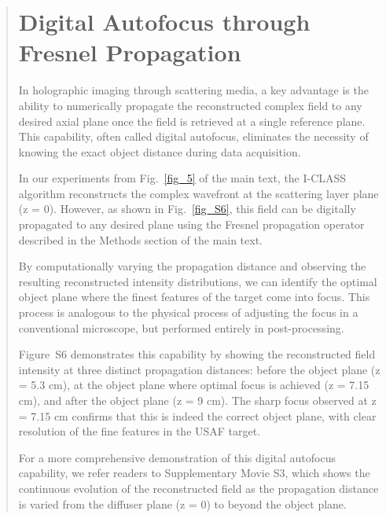 \documentclass[12pt]{article}
\newenvironment{ourresponse}
    {\begin{tcolorbox}[width=\linewidth,breakable,enhanced,colback=gray!5,colframe=responsecolor!50,title=Response,left=5pt,right=5pt]}
    {\end{tcolorbox}}
\begin{document}
\begin{ourresponse}
\begin{quote}
                \section*{Digital Autofocus through Fresnel Propagation}
                
                In holographic imaging through scattering media, a key advantage is the ability to numerically propagate the reconstructed complex field to any desired axial plane once the field is retrieved at a single reference plane. This capability, often called digital autofocus, eliminates the necessity of knowing the exact object distance during data acquisition.
                
                In our experiments from Fig.~\ref{fig_5} of the main text, the I-CLASS algorithm reconstructs the complex wavefront at the scattering layer plane (z = 0). However, as shown in Fig.~\ref{fig_S6}, this field can be digitally propagated to any desired plane using the Fresnel propagation operator described in the Methods section of the main text. 
                
                By computationally varying the propagation distance and observing the resulting reconstructed intensity distributions, we can identify the optimal object plane where the finest features of the target come into focus. This process is analogous to the physical process of adjusting the focus in a conventional microscope, but performed entirely in post-processing.
                
                Figure~S6 demonstrates this capability by showing the reconstructed field intensity at three distinct propagation distances: before the object plane (z = 5.3 cm), at the object plane where optimal focus is achieved (z = 7.15 cm), and after the object plane (z = 9 cm). The sharp focus observed at z = 7.15 cm confirms that this is indeed the correct object plane, with clear resolution of the fine features in the USAF target.
                
                For a more comprehensive demonstration of this digital autofocus capability, we refer readers to Supplementary Movie S3, which shows the continuous evolution of the reconstructed field as the propagation distance is varied from the diffuser plane (z = 0) to beyond the object plane.
        

\end{quote}
\end{ourresponse}
\end{document}
